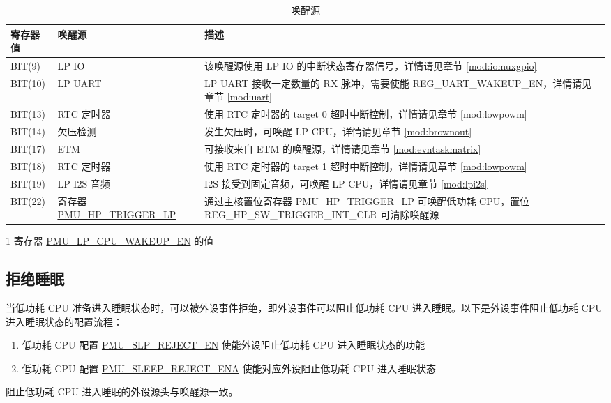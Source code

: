 \documentclass[main\_\_CN.tex]{subfiles}
\begin{document}
    \begin{table}[H]
    \centering
    \caption{唤醒源}
    \label{tab:ulp-wake-sources}
    \begin{threeparttable}
    \begin{tabular}{| l | l | m{9cm}|}
    \hline
    \rowcolor{lightgray}
    寄存器值\tnote{1} & 唤醒源 & 描述  \\\hline

    BIT(9) & LP IO & 该唤醒源使用 LP IO 的中断状态寄存器信号，详情请见章节  \ref{mod:iomuxgpio} \textit{\nameref{mod:iomuxgpio}} \\\hline
    BIT(10) & LP UART & LP UART 接收一定数量的 RX 脉冲，需要使能 REG\_UART\_WAKEUP\_EN，详情请见章节 \ref{mod:uart} \textit{\nameref{mod:uart}} \\\hline
    BIT(13) & RTC 定时器 & 使用 RTC 定时器的 target 0 超时中断控制，详情请见章节 \ref{mod:lowpowm} \textit{\nameref{mod:lowpowm}} \\\hline
    BIT(14) & 欠压检测 & 发生欠压时，可唤醒 LP CPU，详情请见章节 \ref{mod:brownout} \textit{\nameref{mod:brownout}} \\\hline
    BIT(17) & ETM & 可接收来自 ETM 的唤醒源，详情请见章节 \ref{mod:evntaskmatrix} \textit{\nameref{mod:evntaskmatrix}} \\\hline
    BIT(18) & RTC 定时器 & 使用 RTC 定时器的 target 1 超时中断控制，详情请见章节 \ref{mod:lowpowm} \textit{\nameref{mod:lowpowm}} \\\hline
    BIT(19) & LP I2S 音频 & I2S 接受到固定音频，可唤醒 LP CPU，详情请见章节 \ref{mod:lpi2s} \textit{\nameref{mod:lpi2s}}\\\hline
    BIT(22) & 寄存器 \hyperref[fielddesc:PMUHPTRIGGERLP]{PMU\_HP\_TRIGGER\_LP} & 通过主核置位寄存器 \hyperref[fielddesc:PMUHPTRIGGERLP]{PMU\_HP\_TRIGGER\_LP} 可唤醒低功耗 CPU，置位 REG\_HP\_SW\_TRIGGER\_INT\_CLR 可清除唤醒源\\\hline
\end{tabular}
    \begin{tablenotes}
        \item[1] 寄存器 \hyperref[fielddesc:PMULPCPUWAKEUPEN]{PMU\_LP\_CPU\_WAKEUP\_EN} 的值
    \end{tablenotes}
    \end{threeparttable}
\end{table}

\subsection{拒绝睡眠}

当低功耗 CPU 准备进入睡眠状态时，可以被外设事件拒绝，即外设事件可以阻止低功耗 CPU 进入睡眠。以下是外设事件阻止低功耗 CPU 进入睡眠状态的配置流程：

\begin{enumerate}
    \item 低功耗 CPU 配置 \hyperref[fielddesc:PMUSLPREJECTEN]{PMU\_SLP\_REJECT\_EN} 使能外设阻止低功耗 CPU 进入睡眠状态的功能
    \item 低功耗 CPU 配置 \hyperref[fielddesc:PMUSLEEPREJECTENA]{PMU\_SLEEP\_REJECT\_ENA} 使能对应外设阻止低功耗 CPU 进入睡眠状态
\end{enumerate}

阻止低功耗 CPU 进入睡眠的外设源头与唤醒源一致。
\end{document}
